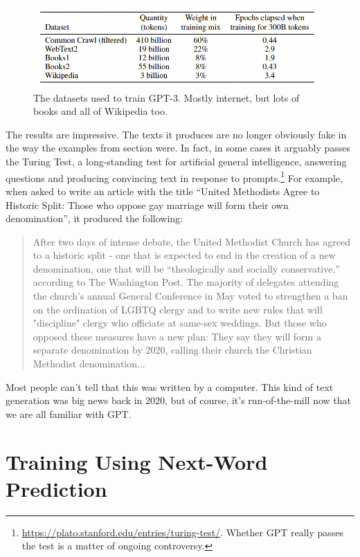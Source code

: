 \begin{figure}[h]
\centering
\includegraphics[scale=.4]{./images/gptDatasets}
\caption[GPT Technical report. Todo]{The datasets used to train GPT-3. Mostly internet, but lots of books and all of Wikipedia too. }
\label{gptDatasets}
\end{figure}

The results are impressive. The texts it produces are no longer obviously fake in the way the examples from section  were. In fact, in some cases it arguably passes the Turing Test, a long-standing test for artificial general intelligence, answering questions and producing convincing  text in response to prompts.\footnote{\url{https://plato.stanford.edu/entries/turing-test/}. Whether GPT really passes the test is a matter of ongoing controversy.} For example, when asked to write an article with the title ``United Methodists Agree to Historic Split: Those who oppose gay marriage will form their own denomination'', it produced the following:
\begin{quote}
After two days of intense debate, the United Methodist Church has agreed to a historic split - one that is expected to end in the creation of a new denomination, one that will be ``theologically and socially conservative,'' according to The Washington Post. The majority of delegates attending the church's annual General Conference in May voted to strengthen a ban on the ordination of LGBTQ clergy and to write new rules that will "discipline" clergy who officiate at same-sex weddings. But those who opposed these measures have a new plan: They say they will form a separate denomination by 2020, calling their church the Christian Methodist denomination...
\end{quote}
Most people can't tell that this was written by a computer.  This kind of text generation was big news back in 2020, but of course, it's run-of-the-mill now that we are all familiar with GPT.

\section{Training Using Next-Word Prediction}

